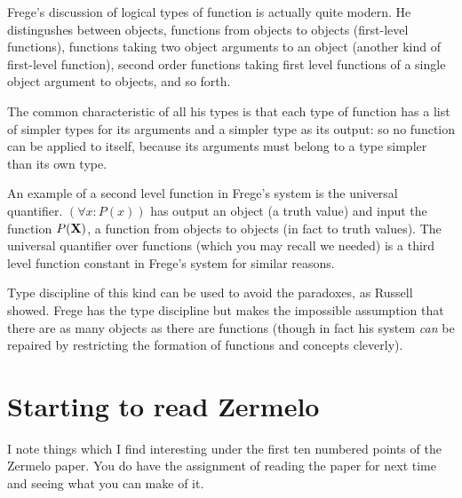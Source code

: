 \documentclass[12pt]{article}
\begin{document}
Frege's discussion of logical types of function is actually quite modern.  He distingushes between objects, functions from objects to objects (first-level functions), functions taking two object arguments to an object (another kind of first-level function), second order functions taking first level functions of a single object argument to objects, and so forth.

The common characteristic of all his types is that each type of function has a list of simpler types for its arguments and a simpler type as its output:  so no function can be applied to itself,
because its arguments must belong to a type simpler than its own type.

An example of a second level function in Frege's system is the universal quantifier. $(\forall x:P(x))$ has output an object (a truth value) and input the function $P({\bf X})$, a function from objects to objects (in fact to truth values).  The universal quantifier over functions (which you may recall we needed) is a third level function constant in Frege's system for similar reasons.

Type discipline of this kind can be used to avoid the paradoxes, as Russell showed.  Frege has the type discipline but makes the impossible assumption that there are as many objects as there are functions (though in fact his system {\em can \/} be repaired by restricting the formation of functions and concepts cleverly).

\section{Starting to read Zermelo}

I note things which I find interesting under the first ten numbered points of the Zermelo paper. You do have the assignment of reading the paper for next time and seeing what you can make of it.
\end{document}
